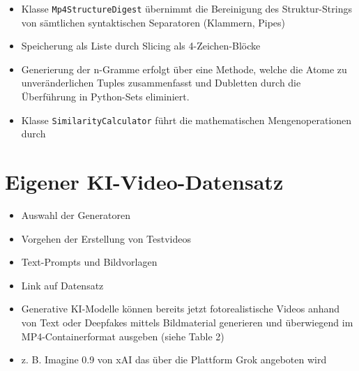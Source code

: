 \begin{itemize}
    \item Klasse \verb|Mp4StructureDigest| übernimmt die Bereinigung des Struktur-Strings von sämtlichen syntaktischen Separatoren (Klammern, Pipes)
    \item Speicherung als Liste durch Slicing als 4-Zeichen-Blöcke
    \item Generierung der n-Gramme erfolgt über eine Methode, welche die Atome zu unveränderlichen Tuples zusammenfasst und Dubletten durch die Überführung in Python-Sets eliminiert.
    \item Klasse \verb|SimilarityCalculator| führt die mathematischen Mengenoperationen durch 
\end{itemize}






\section{Eigener KI-Video-Datensatz}

\begin{itemize}
    \item Auswahl der Generatoren
    \item Vorgehen der Erstellung von Testvideos
    \item Text-Prompts und Bildvorlagen
    \item Link auf Datensatz
    \item Generative KI-Modelle können bereits jetzt fotorealistische Videos anhand von Text oder Deepfakes mittels Bildmaterial generieren und überwiegend im MP4-Containerformat ausgeben (siehe Table 2)
    \item z. B. Imagine 0.9 von xAI das über die Plattform Grok angeboten wird
\end{itemize}


